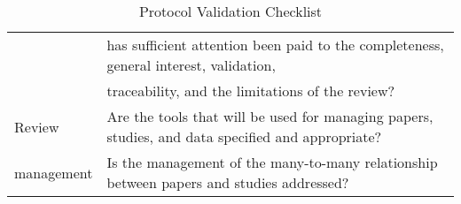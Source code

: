 \begin{table}[H]
\begin{center}
{\begin{tabular}{|l||l|}
                                & has sufficient attention been paid to the completeness, general interest, validation,      \\
                                & traceability, and the limitations of the review?                                            \\
                    \hline
                    Review      & Are the tools that will be used for managing papers, studies, and data specified and appropriate?\\
                    management  & Is the management of the many-to-many relationship between papers and studies addressed? \\
                    \hline
            \end{tabular}}
    \end{center}
    \caption{Protocol Validation Checklist}
    \label{table:protocolValidation}
\end{table}
